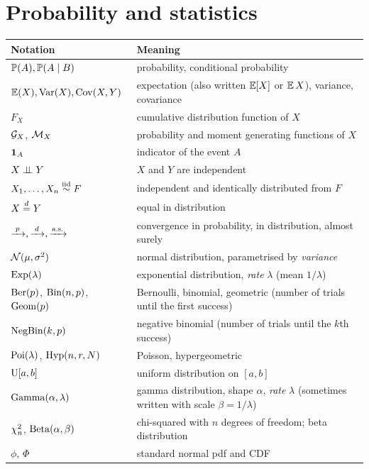\section*{Probability and statistics}
\begin{tabular}{@{}lp{}@{}}
\toprule
Notation & Meaning \\
\midrule
$\mathbb{P}(A), \mathbb{P}(A \mid B)$ & probability, conditional probability \\
$\operatorname{\mathbb{E}}(X), \operatorname{Var}(X), \operatorname{Cov}(X, Y)$ & expectation (also written $\operatorname{\mathbb{E}}[X]$ or $\operatorname{\mathbb{E}} X$), variance, covariance \\
$F_X$ & cumulative distribution function of $X$ \\
$\mathcal{G}_X$, $\mathcal{M}_X$ & probability and moment generating functions of $X$ \\
$\mathbf{1}_A$ & indicator of the event $A$ \\
$X \perp\!\!\!\perp Y$ & $X$ and $Y$ are independent \\
$X_1, \ldots, X_n \overset{\text{iid}}{\sim} F$ & independent and identically distributed from $F$ \\
$X \overset{d}{=} Y$ & equal in distribution \\
$\xrightarrow{\;p\;}, \xrightarrow{\;d\;}, \xrightarrow{\text{a.s.}}$ & convergence in probability, in distribution, almost surely \\
$\mathcal{N}(\mu, \sigma^2)$ & normal distribution, parametrised by \emph{variance} \\
$\mathrm{Exp}(\lambda)$ & exponential distribution, \emph{rate} $\lambda$ (mean $1/\lambda$) \\
$\mathrm{Ber}(p)$, $\mathrm{Bin}(n, p)$, $\mathrm{Geom}(p)$ & Bernoulli, binomial, geometric (number of trials until the first success) \\
$\mathrm{NegBin}(k, p)$ & negative binomial (number of trials until the $k$th success) \\
$\mathrm{Poi}(\lambda)$, $\mathrm{Hyp}(n, r, N)$ & Poisson, hypergeometric \\
$\mathrm{U}[a, b]$ & uniform distribution on $[a, b]$ \\
$\mathrm{Gamma}(\alpha, \lambda)$ & gamma distribution, shape $\alpha$, \emph{rate} $\lambda$ (sometimes written with scale $\beta = 1/\lambda$) \\
$\chi^2_{n}$, $\mathrm{Beta}(\alpha, \beta)$ & chi-squared with $n$ degrees of freedom; beta distribution \\
$\phi$, $\Phi$ & standard normal pdf and CDF \\
\bottomrule
\end{tabular}
